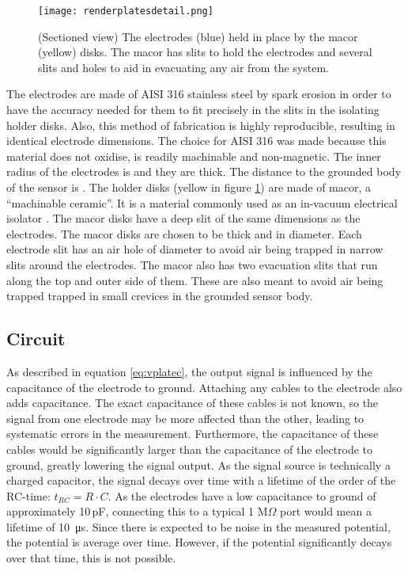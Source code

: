 \begin{figure}[H]
 \centering
 \texttt{[image: renderplatesdetail.png]}
 \caption{(Sectioned view) The electrodes (blue) held in place by the macor (yellow) disks. The macor has slits to hold the electrodes and several slits and holes to aid in evacuating any air from the system.}
 \label{fig:plates}
\end{figure}

The electrodes are made of AISI 316 stainless steel by spark erosion in order to have the accuracy needed for them to fit precisely in the slits in the isolating holder disks. Also, this method of fabrication is highly reproducible, resulting in identical electrode dimensions. The choice for AISI 316 was made because this material does not oxidise, is readily machinable and non-magnetic. 
The inner radius of the electrodes is  and they are  thick. The distance to the grounded body of the sensor is .
The holder disks (yellow in figure \ref{fig:plates}) are made of macor, a ``machinable ceramic''. It is a material commonly used as an in-vacuum electrical isolator . The macor disks have a  deep slit of the same dimensions as the electrodes. The macor disks are chosen to be  thick and  in diameter. Each electrode slit has an air hole of  diameter to avoid air being trapped in narrow slits around the electrodes. The macor also has two evacuation slits that run along the top and outer side of them. These are also meant to avoid air being trapped trapped in small crevices in the grounded sensor body.

\subsection{Circuit}
\label{sec:design/circuit}
As described in equation \ref{eq:vplatec}, the output signal is influenced by the capacitance of the electrode to ground. Attaching any cables to the electrode also adds capacitance. The exact capacitance of these cables is not known, so the signal from one electrode may be more affected than the other, leading to systematic errors in the measurement.
Furthermore, the capacitance of these cables would be significantly larger than the capacitance of the electrode to ground, greatly lowering the signal output.
As the signal source is technically a charged capacitor, the signal decays over time with a lifetime of the order of the RC-time: $t_{RC} = R\cdot C$. As the electrodes have a low capacitance to ground of approximately 10\,pF, connecting this to a typical 1 M$\Omega$ port would mean a lifetime of \SI{10}{\micro\second}. Since there is expected to be noise in the measured potential, the potential is average over time. However, if the potential significantly decays over that time, this is not possible.

